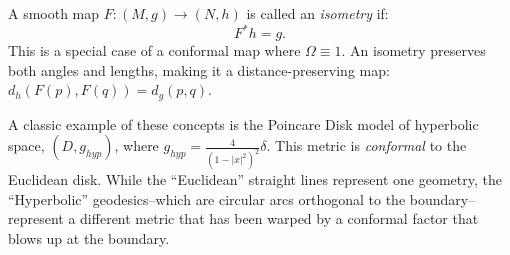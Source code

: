 \begin{definition}
  A smooth map $F : (M, g) \to (N, h)$ is called an \emph{isometry} if:
  \[%
    F^*h = g
  .\]%
  This is a special case of a conformal map where $\Omega \equiv 1$. An isometry preserves both angles and lengths, making it a distance-preserving map: $d_h(F(p), F(q)) = d_g(p, q)$.
\end{definition}

\begin{example}
  A classic example of these concepts is the Poincare Disk model of hyperbolic space, $(D, g_{hyp})$, where $g_{hyp} = \frac{4}{(1-|x|^2)^2} \delta$. This metric is \emph{conformal} to the Euclidean disk. While the ``Euclidean'' straight lines represent one geometry, the ``Hyperbolic'' geodesics--which are circular arcs orthogonal to the boundary--represent a different metric that has been warped by a conformal factor that blows up at the boundary.
\end{example}
